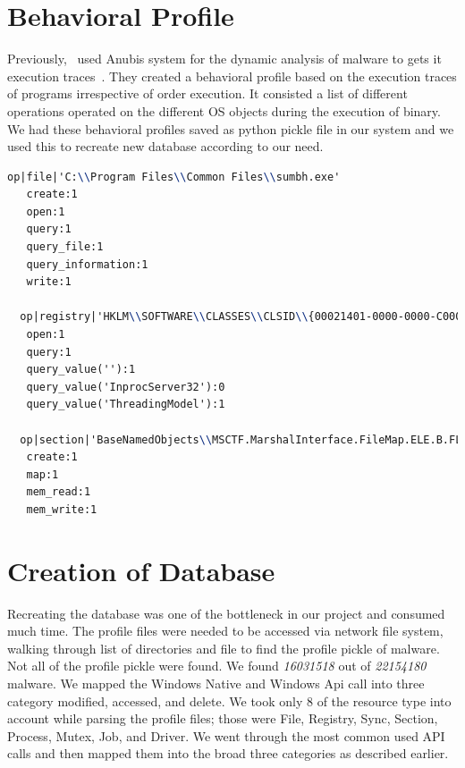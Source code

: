 \section{Behavioral Profile}
\label{sec:behvairoalprofile}
Previously,~\citeauthor{bayer} used Anubis system for the dynamic analysis of malware to gets it execution traces~\cite[]{bayer}.
They created a behavioral profile based on the execution traces of programs irrespective of order execution. It consisted a list of different operations operated on the different OS objects during the execution of binary.
We had these behavioral profiles saved as python pickle file in our system and we used this to recreate new database according to our need.
\begin{lstlisting}[language=TeX,caption={Behvaioral Profile sample}, label={lst:bpsample}]
  op|file|'C:\\Program Files\\Common Files\\sumbh.exe'
   create:1
   open:1
   query:1
   query_file:1
   query_information:1
   write:1

  op|registry|'HKLM\\SOFTWARE\\CLASSES\\CLSID\\{00021401-0000-0000-C000-000000000046}\\INPROCSERVER32'
   open:1
   query:1
   query_value(''):1
   query_value('InprocServer32'):0
   query_value('ThreadingModel'):1

  op|section|'BaseNamedObjects\\MSCTF.MarshalInterface.FileMap.ELE.B.FLKMG'
   create:1
   map:1
   mem_read:1
   mem_write:1
\end{lstlisting}
\section{Creation of Database}
\label{sec:Creation of Database}
Recreating the database was one of the bottleneck in our project and consumed much time. The profile files were needed to be accessed via network file system, walking through list of directories and file to find the profile pickle of malware. Not all of the profile pickle were found. We found \emph{16031518 } out of \emph{22154180} malware.
We mapped the Windows Native and Windows Api call into three category modified, accessed, and delete. We took only 8 of the resource type into account while parsing the profile files; those were File, Registry, Sync, Section, Process, Mutex, Job, and Driver. We went through the most common used API calls and then mapped them into the broad three categories as described earlier.


